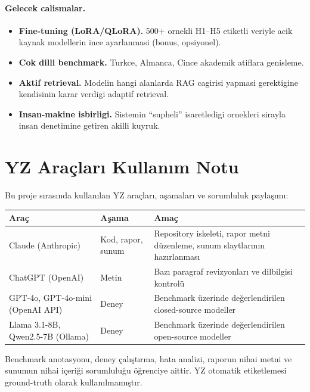 \documentclass[11pt,a4paper]{article}
\begin{document}
\paragraph{Gelecek calismalar.}
\begin{itemize}[nosep]
\item \textbf{Fine-tuning (LoRA/QLoRA).} 500+ ornekli H1--H5 etiketli veriyle
acik kaynak modellerin ince ayarlanmasi (bonus, opsiyonel).
\item \textbf{Cok dilli benchmark.} Turkce, Almanca, Cince akademik atiflara
genisleme.
\item \textbf{Aktif retrieval.} Modelin hangi alanlarda RAG cagirisi yapmasi
gerektigine kendisinin karar verdigi adaptif retrieval.
\item \textbf{Insan-makine isbirligi.} Sistemin ``supheli'' isaretledigi
ornekleri sirayla insan denetimine getiren akilli kuyruk.
\end{itemize}

\printbibliography[heading=bibnumbered, title={Kaynakca}]

\appendix

\section{YZ Araçları Kullanım Notu}
\label{appx:ai}
Bu proje sırasında kullanılan YZ araçları, aşamaları ve sorumluluk paylaşımı:

\begin{tabularx}{\columnwidth}{l l X}
\toprule
\textbf{Araç} & \textbf{Aşama} & \textbf{Amaç} \\
\midrule
Claude (Anthropic) & Kod, rapor, sunum & Repository iskeleti, rapor metni düzenleme, sunum slaytlarının hazırlanması \\
ChatGPT (OpenAI)   & Metin             & Bazı paragraf revizyonları ve dilbilgisi kontrolü \\
GPT-4o, GPT-4o-mini (OpenAI API) & Deney & Benchmark üzerinde değerlendirilen closed-source modeller \\
Llama 3.1-8B, Qwen2.5-7B (Ollama) & Deney & Benchmark üzerinde değerlendirilen open-source modeller \\
\bottomrule
\end{tabularx}

\noindent Benchmark anotasyonu, deney çalıştırma, hata analizi, raporun nihai metni
ve sunumun nihai içeriği sorumluluğu öğrenciye aittir. YZ otomatik
etiketlemesi ground-truth olarak kullanılmamıştır.
\end{document}
